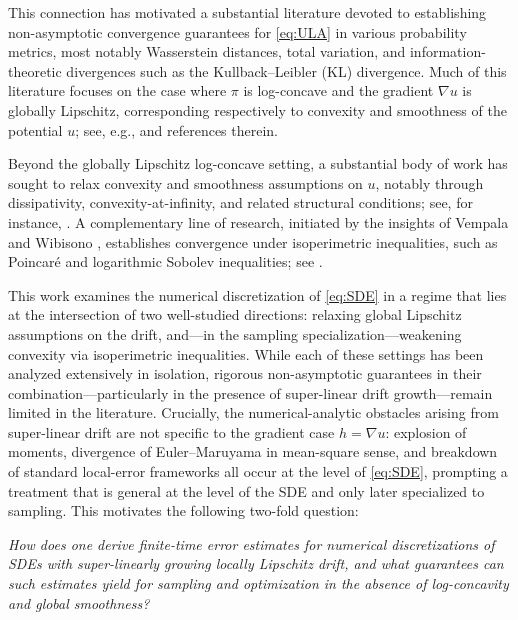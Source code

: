 \documentclass[11pt,a4paper,reqno]{amsart}
\theoremstyle{plain}
\theoremstyle{definition}
\theoremstyle{remark}
\begin{document}
This connection has motivated a substantial literature devoted to establishing
non-asymptotic convergence guarantees for \eqref{eq:ULA} in various probability metrics,
most notably Wasserstein distances, total variation, and information-theoretic divergences
such as the Kullback--Leibler (KL) divergence.
Much of this literature focuses on the case where $\pi$ is log-concave and the gradient
$\nabla u$ is globally Lipschitz, corresponding respectively to convexity and smoothness
of the potential $u$; see, e.g.,
\cite{dalalyan,unadjusted,aew} and references therein.

Beyond the globally Lipschitz log-concave setting, a substantial body of work has sought to relax convexity and smoothness assumptions on \(u\), notably through dissipativity, convexity-at-infinity, and related structural conditions; see, for instance,
\cite{dalalyan2016theoreticalguaranteesapproximatesampling,majka2018non,chewi2024analysislangevinmontecarlo,raginsky}.
A complementary line of research, initiated by the insights of Vempala and Wibisono \cite{vempala2019rapid}, establishes convergence under isoperimetric inequalities, such as Poincaré and logarithmic Sobolev inequalities; see
\cite{erdogdu2021convergence,erdogdu2022convergence,chewi2024analysislangevinmontecarlo,mousavi2023towards}.


This work examines the numerical discretization of \eqref{eq:SDE} in a regime that lies at the intersection of two well-studied directions: relaxing global Lipschitz assumptions on the drift, and---in the sampling specialization---weakening convexity via isoperimetric inequalities. While each of these settings has been analyzed extensively in isolation, rigorous non-asymptotic guarantees in their combination---particularly in the presence of super-linear drift growth---remain limited in the literature. Crucially, the numerical-analytic obstacles arising from super-linear drift are not specific to the gradient case $h = \nabla u$: explosion of moments, divergence of Euler--Maruyama in mean-square sense, and breakdown of standard local-error frameworks all occur at the level of \eqref{eq:SDE}, prompting a treatment that is general at the level of the SDE and only later specialized to sampling. This motivates the following two-fold question:
\begin{center}
\emph{
How does one derive finite-time error estimates for numerical discretizations of SDEs with super-linearly growing locally Lipschitz drift, and what guarantees can such estimates yield for sampling and optimization in the absence of log-concavity and global smoothness?
}
\end{center}
\end{document}
